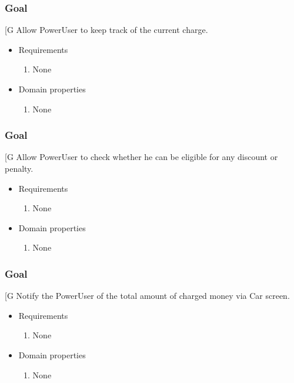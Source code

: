     \subsubsection{Goal }
    {[}G\arabic{goalctr}{]}
    Allow PowerUser to keep track of the current charge.
    \begin{itemize}
        \item Requirements
        \begin{enumerate}[REQ]
    			\item None
        \end{enumerate}
        \item Domain properties
        \begin{enumerate}[PRO]
    			\item None
        \end{enumerate}
    \end{itemize}
    
    \subsubsection{Goal }
    {[}G\arabic{goalctr}{]}
    Allow PowerUser to check whether he can be eligible for any discount or penalty.
    \begin{itemize}
        \item Requirements
        \begin{enumerate}[REQ]
    			\item None
        \end{enumerate}
        \item Domain properties
        \begin{enumerate}[PRO]
    			\item None
        \end{enumerate}
    \end{itemize}
    
    \subsubsection{Goal }
    {[}G\arabic{goalctr}{]}
    Notify the PowerUser of the total amount of charged money via Car screen.
    \begin{itemize}
        \item Requirements
        \begin{enumerate}[REQ]
    			\item None
        \end{enumerate}
        \item Domain properties
        \begin{enumerate}[PRO]
    			\item None
        \end{enumerate}
    \end{itemize}
 
